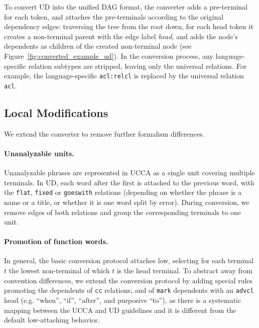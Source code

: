 \documentclass[11pt,a4paper]{article}
\begin{document}
To convert UD into the unified DAG format,
the converter adds a pre-terminal for each token,
and attaches the pre-terminals according to the original dependency edges:
traversing the tree from the root down, for each head token it creates a non-terminal
parent with the edge label {\it head},
and adds the node's dependents as children of the created non-terminal node
(see Figure~\ref{fig:converted_example_ud}).
In the conversion process, any language-specific relation subtypes are stripped,
leaving only the universal relations.
For example, the language-specific \texttt{acl:relcl} is replaced by the universal relation \texttt{acl}.

\subsection{Local Modifications}\label{sec:local}

We extend the converter to remove further formalism differences.

\paragraph{Unanalyzable units.}
Unanalyzable phrases are represented in UCCA as a single unit covering multiple terminals.
In UD, each word after the first is attached to the previous word,
with the \texttt{flat}, \texttt{fixed} or \texttt{goeswith} relations
(depending on whether the phrase is a name or a title, or whether it is one word split by error).
During conversion, we remove edges of both relations and group the corresponding terminals to one unit.

\paragraph{Promotion of function words.}
In general, the basic conversion protocol attaches low,
selecting for each terminal $t$ the lowest non-terminal of which $t$
is the head terminal.
To abstract away from convention differences,
we extend the conversion protocol by adding special rules
promoting the dependents of \texttt{cc} relations,
and of \texttt{mark} dependents with an \texttt{advcl} head
(e.g. ``when'', ``if'', ``after'', and purposive ``to''),
as there is a systematic mapping between the UCCA and UD guidelines
and it is different from the default low-attaching behavior.
\end{document}
